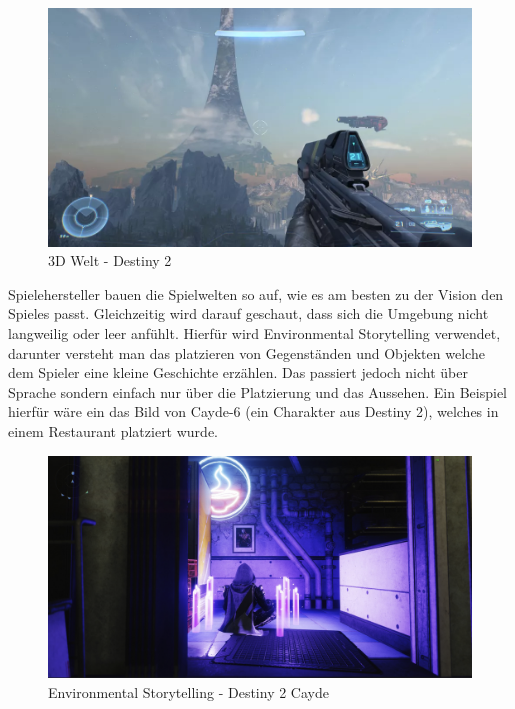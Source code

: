 \begin {figure}
    \includegraphics[scale=0.18]{pics/3d_welt_halo_ring}
    \caption{3D Welt - Destiny 2}
    \label{fig:3d_environment_destiny2}
\end {figure}

Spielehersteller bauen die Spielwelten so auf, wie es am besten zu der Vision den Spieles passt.
Gleichzeitig wird darauf geschaut, dass sich die Umgebung nicht langweilig oder leer anfühlt.
Hierfür wird Environmental Storytelling verwendet, darunter versteht man das platzieren von Gegenständen und Objekten
welche dem Spieler eine kleine Geschichte erzählen.
Das passiert jedoch nicht über Sprache sondern einfach nur über die Platzierung und das Aussehen.
Ein Beispiel hierfür w\"are ein das Bild von Cayde-6 (ein Charakter aus Destiny 2), welches in einem Restaurant platziert wurde.
~\cite{GameDeveloper_2022}

\begin {figure}
    \includegraphics[scale=0.18]{pics/3d_welt_destiny2-environmental-storytelling}
    \caption{Environmental Storytelling - Destiny 2 Cayde}
    \label{fig:3d_environmental_storytelling_destiny2}
\end {figure}


